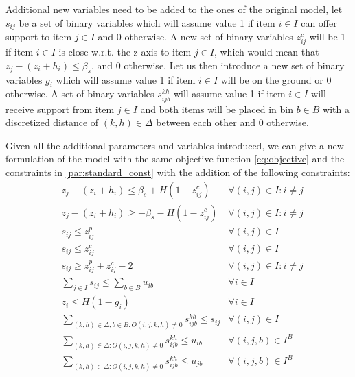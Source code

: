 Additional new variables need to be added to the ones of the original model, let $s_{ij}$ be a set of binary variables which will assume value 1 if item $i \in I$ can offer support to item $j \in I$ and 0 otherwise. A new set of binary variables $z^c_{ij}$ will be 1 if item $i \in I$ is close w.r.t. the z-axis to item $j \in I$, which would mean that $z_j - (z_i + h_i) \le \beta_s$, and 0 otherwise.
Let us then introduce a new set of binary variables $g_i$ which will assume value 1 if item $i \in I$ will be on the ground or 0 otherwise. A set of binary variables $s^{kh}_{i j b}$ will assume value 1 if item $i \in I$ will receive support from item $j \in I$ and both items will be placed in bin $b \in B$ with a discretized distance of $(k, h) \in \Delta$ between each other and 0 otherwise.

Given all the additional parameters and variables introduced, we can give a new formulation of the model with the same objective function \ref{eq:objective} and the constraints in \cref{par:standard_const} with the addition of the following constraints:
\label{par:support_const}
\begin{align}
    & z_j - (z_i + h_i) \le \beta_s + H (1 - z^c_{ij}) & \forall (i, j) \in I : i \neq j \label{cons:z_close_1} \\
    & z_j - (z_i + h_i) \ge -\beta_s - H (1 - z^c_{ij}) & \forall (i, j) \in I : i \neq j \label{cons:z_close_2} \\
    & s_{ij} \le z^p_{ij} & \forall (i, j) \in I  \label{cons:supporting_1} \\
    & s_{ij} \le z^c_{ij} & \forall (i, j) \in I  \label{cons:supporting_2} \\
    & s_{ij} \ge z^p_{ij} + z^c_{ij} - 2 & \forall (i, j) \in I : i \neq j \label{cons:supporting} \\
    & \sum\limits_{j \in I}{s_{ij}} \le \sum\limits_{b \in B}{u_{ib}} & \forall i \in I  \label{cons:support_comes_from_placed} \\
    & z_i \le H(1 - g_i) & \forall i \in I \label{cons:grounded} \\
    & \sum\limits_{(k, h) \in \Delta, b \in B : O(i, j, k, h) \neq 0} s^{k h}_{i j b} \le s_{ij} & \forall (i, j) \in I \label{cons:discretized_support_same} \\
    & \sum\limits_{(k, h) \in \Delta : O(i, j, k, h) \neq 0} s^{k h}_{i j b} \le u_{ib} & \forall (i, j, b) \in I^B \label{cons:discretized_support_right_bin_i} \\
    & \sum\limits_{(k, h) \in \Delta : O(i, j, k, h) \neq 0} s^{k h}_{i j b} \le u_{jb} & \forall (i, j, b) \in I^B \label{cons:discretized_support_right_bin_j}
\end{align}
